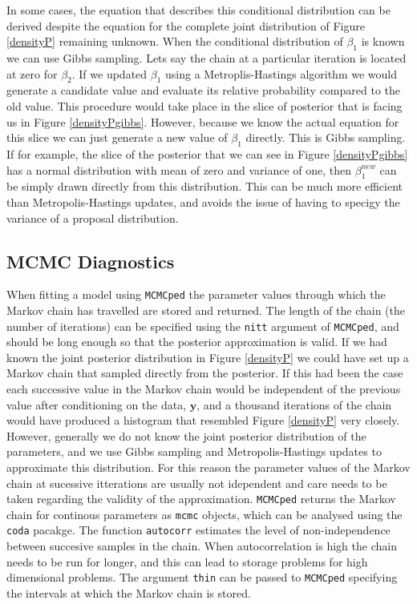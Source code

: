 \documentclass{article}
\begin{document}
 In some cases, the equation that describes this conditional distribution can be derived despite the equation for the complete joint distribution of Figure \ref{densityP} remaining unknown.  When the conditional distribution of $\beta_{1}$ is known we can use Gibbs sampling. Lets say the chain at a particular iteration is located at zero for $\beta_{2}$.  If we updated $\beta_{1}$ using a Metroplis-Hastings algorithm we would generate a candidate value and evaluate its relative probability compared to the old value.  This procedure would take place in the slice of posterior that is facing us in Figure \ref{densityPgibbs}. However, because we know the actual equation for this slice we can just generate a new value of $\beta_{1}$ directly. This is Gibbs sampling.  If for example, the slice of the posterior that we can see in Figure \ref{densityPgibbs} has a normal distribution with mean of zero and variance of one, then $\beta_{1}^{new}$ can be simply drawn directly from this distribution. This can be much more efficient than Metropolis-Hastings updates, and avoids the issue of having to specigy the variance of a proposal distribution.\\

\subsection{MCMC Diagnostics}
\label{MCMC.D-sec}

When fitting a model using \texttt{MCMCped} the parameter values through which the Markov chain has travelled are stored and returned.  The length of the chain (the number of iterations) can be specified using the \texttt{nitt} argument of \texttt{MCMCped}, and should be long enough so that the posterior approximation is valid.  If we had known the joint posterior distribution in Figure \ref{densityP} we could have set up a Markov chain that sampled directly from the posterior.  If this had been the case each successive value in the Markov chain would be independent of the previous value after conditioning on the data, ${\bm y}$, and a thousand iterations of the chain would have produced a histogram that resembled Figure \ref{densityP} very closely.  However, generally we do not know the joint posterior distribution of the parameters, and we use Gibbs sampling and Metropolis-Hastings updates to approximate this distribution. For this reason the parameter values of the Markov chain at sucessive itterations are usually not idependent and care needs to be taken regarding the validity of the approximation.  \texttt{MCMCped} returns the Markov chain for continous parameters as \texttt{mcmc} objects, which can be analysed using the \texttt{coda} pacakge.  The function \texttt{autocorr} estimates the level of non-independence between succesive samples in the chain.  When autocorrelation is high the chain needs to be run for longer, and this can lead to storage problems for high dimensional problems. The argument \texttt{thin} can be passed to \texttt{MCMCped} specifying the intervals at which the Markov chain is stored.\\
\end{document}
